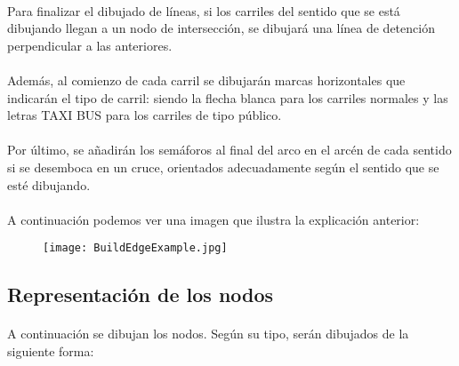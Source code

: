 	\paragraph{}
	Para finalizar el dibujado de líneas, si los carriles del sentido que se está dibujando llegan a un nodo de intersección, se dibujará una línea de detención perpendicular a las anteriores.
	\paragraph{}
	Además, al comienzo de cada carril se dibujarán marcas horizontales que indicarán el tipo de carril: siendo la flecha blanca para los carriles normales y las letras TAXI BUS para los carriles de tipo público.
	\paragraph{}
	Por último, se añadirán los semáforos al final del arco en el arcén de cada sentido si se desemboca en un cruce, orientados adecuadamente según el sentido que se esté dibujando.
	\paragraph{}
	A continuación podemos ver una imagen que ilustra la explicación anterior:
	
	\begin{figure}[H]
		\centering
			\texttt{[image: BuildEdgeExample.jpg]}
	\end{figure}
	
	\subsection{Representación de los nodos}
	\paragraph{}
	A continuación se dibujan los nodos. Según su tipo, serán dibujados de la siguiente forma:
	
